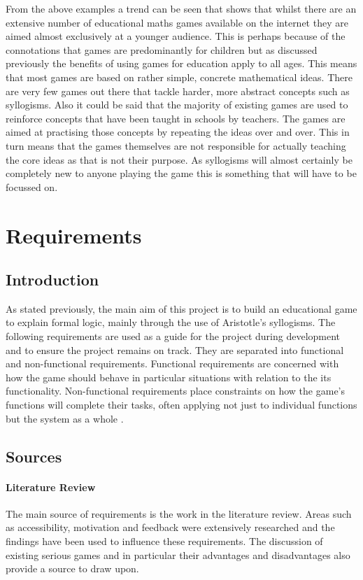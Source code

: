 \documentclass[12pt,a4paper]{report}
\begin{document}
From the above examples a trend can be seen that shows that whilst there are an extensive number of educational maths games available on the internet they are aimed almost exclusively at a younger audience. This is perhaps because of the connotations that games are predominantly for children but as discussed previously the benefits of using games for education apply to all ages. This means that most games are based on rather simple, concrete mathematical ideas. There are very few games out there that tackle harder, more abstract concepts such as syllogisms. Also it could be said that the majority of existing games are used to reinforce concepts that have been taught in schools by teachers. The games are aimed at practising those concepts by repeating the ideas over and over. This in turn means that the games themselves are not responsible for actually teaching the core ideas as that is not their purpose. As syllogisms will almost certainly be completely new to anyone playing the game this is something that will have to be focussed on.


\chapter{Requirements}
\section{Introduction}
As stated previously, the main aim of this project is to build an educational game to explain formal logic, mainly through the use of Aristotle's syllogisms. The following requirements are used as a guide for the project during development and to ensure the project remains on track. They are separated into functional and non-functional requirements. Functional requirements are concerned with how the game should behave in particular situations with relation to the its functionality. 
Non-functional requirements place constraints on how the game's functions will complete their tasks, often applying not just to individual functions but the system as a whole \citep{Sommerville:2006:SE:1196763}.

\section{Sources}
\subsubsection{Literature Review}
The main source of requirements is the work in the literature review. Areas such as accessibility, motivation and feedback were extensively researched and the findings have been used to influence these requirements. The discussion of existing serious games and in particular their advantages and disadvantages also provide a source to draw upon.
\end{document}
